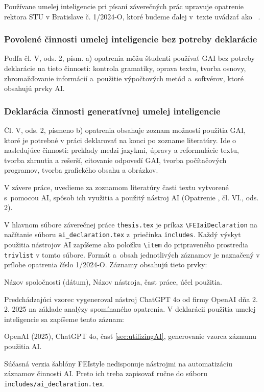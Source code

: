 Používane umelej inteligencie pri písaní záverečných prác
upravuje opatrenie rektora STU v Bratislave č. 1/2024-O, ktoré budeme ďalej v~texte uvádzať ako ~\cite{opatrenie12024}.

\subsubsection*{Povolené činnosti umelej inteligencie bez potreby deklarácie}
Podľa čl. V, ods. 2, písm. a) opatrenia môžu študenti používať GAI bez potreby deklarácie na tieto činnosti: kontrola gramatiky, oprava textu, tvorba osnovy, zhromažďovanie informácií a~použitie výpočtových metód a~softvérov, ktoré obsahujú prvky AI.

\subsubsection*{Deklarácia činnosti generatívnej umelej inteligencie}
Čl. V, ods. 2, písmeno b) opatrenia obsahuje zoznam možností použitia GAI, ktoré je potrebné v práci deklarovať na konci po zozname literatúry.
Ide o nasledujúce činnosti: preklady medzi jazykmi, úpravy a reformulácie textu, tvorba zhrnutia a rešerší, citovanie odpovedí GAI, tvorba počítačových programov, tvorba grafického obsahu a obrázkov.

V závere práce, uvedieme za zoznamom literatúry
časti textu vytvorené s~pomocou AI, spôsob ich využitia a použitý nástroj AI (Opatrenie \cite{opatrenie12024}, čl. VI., ods. 2).

V hlavnom súbore záverečnej práce \verb|thesis.tex| je príkaz
\verb|\FEIaiDeclaration| na načítanie súboru \verb|ai_declaration.tex| z~priečinka \verb|includes|.
Každý výskyt použitia nástrojov AI zapíšeme ako
položku \verb|\item| do pripraveného prostredia
\verb|trivlist| v tomto súbore.
Formát a~obsah jednotlivých záznamov je naznačený v prílohe opatrenia číslo 1/2024-O.
Záznamy obsahujú tieto prvky:
\begin{trivlist}
  \item Názov spoločnosti (dátum), Názov nástroja, čast práce, účel použitia.
\end{trivlist}

Predchádzajúci vzorec vygeneroval nástroj ChatGPT 4o od firmy
OpenAI dňa 2. 2. 2025 na základe analýzy spomínaného opatrenia.
V deklarácii použitia umelej inteligencie sa zapíšeme tento
záznam:
\begin{trivlist}
  \item OpenAI (2025), ChatGPT 4o, časť \ref{sec:utilizingAI},
  generovanie vzorca záznamu použitia AI.
\end{trivlist}

Súčasná verzia šablóny FEIstyle nedisponuje nástrojmi na
automatizáciu záznamov činnosti AI.
Preto ich treba zapisovať ručne do súboru
\verb|includes/ai_declaration.tex|.
